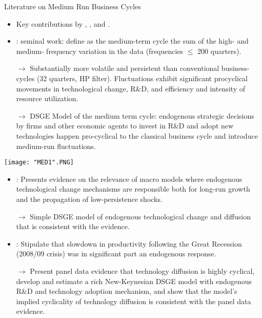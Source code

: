 \documentclass[compress,xcolor=dvipsnames]{beamer}
\newenvironment{noheadline}{
    \setbeamertemplate{headline}{}
    \addtobeamertemplate{frametitle}{\vspace*{-0.9\baselineskip}}{}
}{}
\begin{document}
\begin{noheadline}
\begin{frame}{Literature on Medium Run Business Cycles}
\begin{itemize}
\item Key contributions by \citet{Comin2006}, \citet{Comin2009}, \citet{Bianchi2018} and \citet{Anzoategui2017}.
\item \citet{Comin2006}: seminal work: define as the medium-term cycle the sum of the high- and medium- frequency variation in the data (frequencies $\leq$ 200 quarters).
\item[$\to$] Substantially more volatile and persistent than conventional business-cycles (32 quarters, HP filter). Fluctuations exhibit significant procyclical movements in technological change, R\&D, and efficiency and intensity of resource utilization.
\item[$\to$] DSGE Model of the medium term cycle: endogenous strategic decisions
by firms and other economic agents to invest in R\&D and adopt new technologies happen pro-cyclical to the classical business cycle and introduce medium-run fluctuations.
\end{itemize}
\end{frame}
\end{noheadline}

\begin{frame}
\texttt{[image: "MED1".PNG]}
\end{frame}

\begin{frame}
\begin{itemize}
\item \citet{Comin2009}: Presents evidence on the relevance of macro models where endogenous technological change mechanisms are responsible both for long-run growth and the propagation of low-persistence shocks. 
\item[$\to$] Simple DSGE model of endogenous technological change and diffusion that is consistent with the evidence.
\item \citet{Anzoategui2017}: Stipulate that slowdown in productivity following the Great Recession (2008/09 crisis)  was in significant part an endogenous response. 
\item[$\to$] Present panel data evidence that technology diffusion is highly cyclical, develop and estimate a rich New-Keynesian DSGE model with endogenous R\&D and technology adoption mechanism, and show that the model's implied cyclicality of technology diffusion is consistent with the panel data evidence. 
\end{itemize}
\end{frame}
\end{document}

